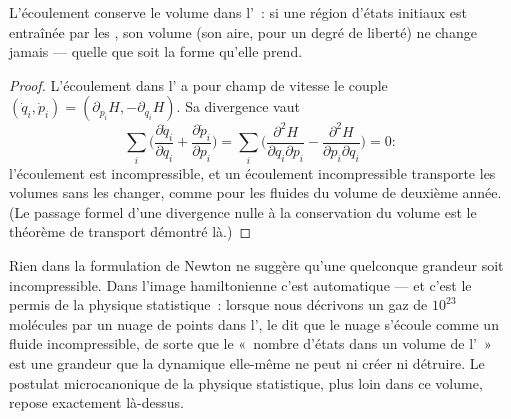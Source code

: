 \begin{theorem}\label{thm:b3:hamiltonian-mechanics:liouville}
L'écoulement  conserve le volume dans l'~:
si une région d'états initiaux est entraînée par les , son volume (son aire, pour un degré de liberté) ne change
jamais --- quelle que soit la forme qu'elle prend.
\end{theorem}

\begin{proof}
L'écoulement dans l' a pour champ
de vitesse le couple $(\dot q_i, \dot p_i) = (\partial_{p_i}H,
-\partial_{q_i}H)$. Sa divergence vaut
\[
\sum_i\Big(\frac{\partial\dot q_i}{\partial q_i}
 + \frac{\partial\dot p_i}{\partial p_i}\Big)
 = \sum_i\Big(\frac{\partial^2H}{\partial q_i\partial p_i}
 - \frac{\partial^2H}{\partial p_i\partial q_i}\Big) = 0 :
\]
l'écoulement est incompressible, et un écoulement incompressible
transporte les volumes sans les changer, comme pour les fluides du
volume de deuxième année. (Le passage formel d'une divergence nulle à
la conservation du volume est le théorème de transport démontré là.)
\end{proof}

\begin{remark}\label{rem:b3:hamiltonian-mechanics:liouville-matters}
Rien dans la formulation de Newton ne suggère qu'une quelconque
grandeur soit incompressible. Dans l'image hamiltonienne c'est
automatique --- et c'est le permis de la physique statistique~: lorsque
nous décrivons un gaz de $10^{23}$ molécules par un nuage de points
dans l', le  dit que le nuage
s'écoule comme un fluide incompressible, de sorte que le «~nombre
d'états dans un volume de l'~» est une grandeur que la
dynamique elle-même ne peut ni créer ni détruire. Le postulat
microcanonique de la physique statistique, plus loin dans ce volume,
repose exactement là-dessus.
\end{remark}

